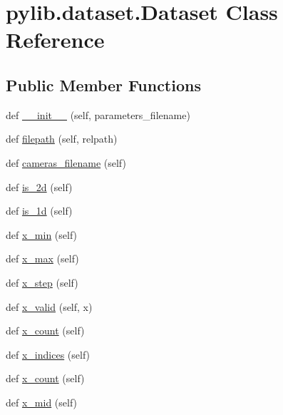 \hypertarget{classpylib_1_1dataset_1_1Dataset}{}\section{pylib.\+dataset.\+Dataset Class Reference}
\label{classpylib_1_1dataset_1_1Dataset}
\subsection*{Public Member Functions}
\begin{DoxyCompactItemize}
\item 
def \hyperlink{classpylib_1_1dataset_1_1Dataset_ae60979ac3585077144c09fce001c8891}{\+\_\+\+\_\+init\+\_\+\+\_\+} (self, parameters\+\_\+filename)
\item 
def \hyperlink{classpylib_1_1dataset_1_1Dataset_aafa977056ff531960cb049a1ad2fa510}{filepath} (self, relpath)
\item 
def \hyperlink{classpylib_1_1dataset_1_1Dataset_a4fa0b052cfa3d4d1fb133515073f59d0}{cameras\+\_\+filename} (self)
\item 
def \hyperlink{classpylib_1_1dataset_1_1Dataset_a376fd4eacf06facd749bb9a14dd848bc}{is\+\_\+2d} (self)
\item 
def \hyperlink{classpylib_1_1dataset_1_1Dataset_a3c96552d2ac1890b3affdd64ff89dc95}{is\+\_\+1d} (self)
\item 
def \hyperlink{classpylib_1_1dataset_1_1Dataset_af10d7a7a19458b2a869d75161c98843e}{x\+\_\+min} (self)
\item 
def \hyperlink{classpylib_1_1dataset_1_1Dataset_a7490824f8eb99adb9a6d8e5ebc1d04ab}{x\+\_\+max} (self)
\item 
def \hyperlink{classpylib_1_1dataset_1_1Dataset_a5ffa85a30634b8554a94c775026ddafc}{x\+\_\+step} (self)
\item 
def \hyperlink{classpylib_1_1dataset_1_1Dataset_aea14391d9f2c263b93341eb6c8597c4e}{x\+\_\+valid} (self, x)
\item 
def \hyperlink{classpylib_1_1dataset_1_1Dataset_a7d148aa9a7ecc8f4a450718d41df1000}{x\+\_\+count} (self)
\item 
def \hyperlink{classpylib_1_1dataset_1_1Dataset_a8961c1e77f9c6f6f7dfeacab95774c14}{x\+\_\+indices} (self)
\item 
def \hyperlink{classpylib_1_1dataset_1_1Dataset_a7d148aa9a7ecc8f4a450718d41df1000}{x\+\_\+count} (self)
\item 
def \hyperlink{classpylib_1_1dataset_1_1Dataset_a57d5ce85a1ee8e745473d9be8860e2ed}{x\+\_\+mid} (self)

\end{DoxyCompactItemize}
